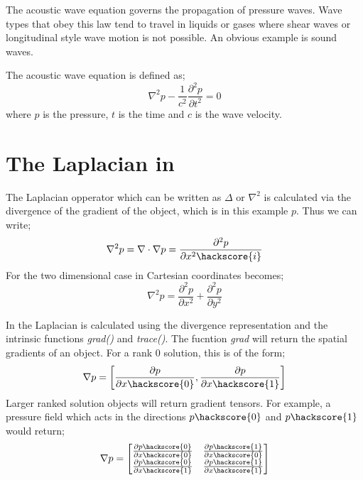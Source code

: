 
%
%
%



The acoustic wave equation governs the propagation of pressure waves. Wave
types that obey this law tend to travel in liquids or gases where shear waves
or longitudinal style wave motion is not possible. An obvious example is sound
waves.

The acoustic wave equation is defined as;
\begin{equation}
 \nabla ^2 p - \frac{1}{c^2} \frac{\partial ^2 p}{\partial t^2} = 0
\label{eqn:acswave}
\end{equation}
where $p$ is the pressure, $t$ is the time and $c$ is the wave velocity. 

\section{The Laplacian in \esc}
The Laplacian opperator which can be written as $\Delta$ or $\nabla^2$  is
calculated via the divergence of the gradient of the object, which is in this
example $p$. Thus we can write;
\begin{equation}
 \nabla^2 p = \nabla \cdot \nabla p = \frac{\partial^2 p}{\partial
x^2\hackscore{i}}
 \label{eqn:laplacian}
\end{equation}
For the two dimensional case in Cartesian coordinates 
becomes;
\begin{equation}
 \nabla^2 p = \frac{\partial^2 p}{\partial x^2} 
		   + \frac{\partial^2 p}{\partial y^2}
\end{equation}

In \esc the Laplacian is calculated using the divergence representation and the
intrinsic functions \textit{grad()} and \textit{trace()}. The fucntion
\textit{grad{}} will return the spatial gradients of an object.  
For a rank 0 solution, this is of the form;
\begin{equation}
 \nabla p = \left[
	   \frac{\partial p}{\partial x \hackscore{0}},  
	   \frac{\partial p}{\partial x \hackscore{1}}
                  \right]
\label{eqn:grad}
\end{equation}
Larger ranked solution objects will return gradient tensors. For example, a
pressure field which acts in the directions $p \hackscore{0}$ and $p
\hackscore{1}$ would return;
\begin{equation}
  \nabla p = \begin{bmatrix}
	   \frac{\partial p \hackscore{0}}{\partial x \hackscore{0}} &
		\frac{\partial p \hackscore{1}}{\partial x \hackscore{0}} \\
	  \frac{\partial p \hackscore{0}}{\partial x \hackscore{1}} &
		\frac{\partial p \hackscore{1}}{\partial x \hackscore{1}} 
                  \end{bmatrix}
\label{eqn:gradrank1}
\end{equation}

